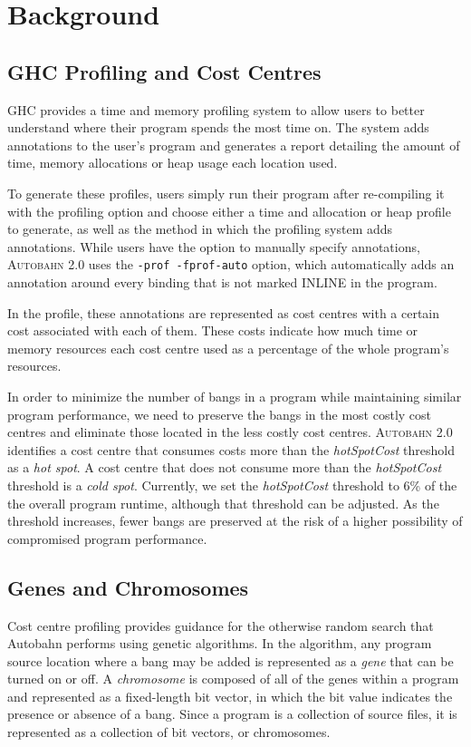 \documentclass[format=sigplan, review=true]{acmart}
\newcommand{\hotspot}[0]{hot spot}
\newcommand{\coldspot}[0]{cold spot}
\newcommand{\hotspotcost}[0]{\textit{hotSpotCost}}
\newcommand{\At}[0]{\textsc{Autobahn 2.0}}
\begin{document}
\section{Background}

\subsection{GHC Profiling and Cost Centres}
GHC provides a time and memory profiling system to allow users to better understand where their program spends 
the most time on. The
system adds annotations to the user's program and generates a report
detailing the amount of time, memory allocations or heap usage each 
location used. 

To generate these profiles, users simply run their program 
after re-compiling it with the profiling option and choose either a time and allocation or heap profile to generate, as well as the method in which the profiling 
system adds annotations. While users have the option to manually specify
annotations, \At{} uses the \texttt{-prof -fprof-auto} option, which
automatically adds an annotation around every binding that is not marked
INLINE in the program.

In the profile, these annotations are represented as cost centres with a 
certain cost associated with each of them. These costs indicate how much
time or memory resources each cost centre used as a percentage of the
whole program's resources. 

In order to minimize the number of bangs in 
a program while maintaining similar program performance, we need to 
preserve the bangs in the most costly cost centres and eliminate those 
located in the less costly cost centres. \At{} identifies a cost centre that consumes costs more than the \hotspotcost{} threshold as a \textit{\hotspot{}}. A cost centre that does not consume more than the \hotspotcost{} threshold is a \textit{\coldspot{}}. Currently, we set the \hotspotcost{} threshold to 6\% of the the overall program runtime, although that threshold can be
adjusted. As the threshold increases, fewer bangs
are preserved at the risk of a higher possibility of compromised program 
performance. 

\subsection{Genes and Chromosomes}

Cost centre profiling provides guidance for the otherwise random search 
that Autobahn performs using genetic algorithms. In the algorithm, any 
program source location where a bang may be added is represented as a \textit{gene} that can 
be turned on or off. A \textit{chromosome} is composed of all of the genes within a 
program and represented as a fixed-length bit vector, in which the bit value 
indicates the presence or absence of a bang. Since a program is a collection of source files, it is represented as a collection of bit vectors, or chromosomes.
\end{document}
